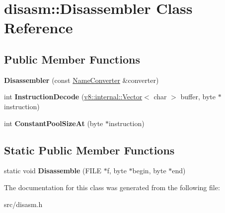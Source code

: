 \hypertarget{classdisasm_1_1_disassembler}{}\section{disasm\+:\+:Disassembler Class Reference}
\label{classdisasm_1_1_disassembler}
\subsection*{Public Member Functions}
\begin{DoxyCompactItemize}
\item 
\hypertarget{classdisasm_1_1_disassembler_a316f56d6b74b4785b50e61ee1586e9a0}{}{\bfseries Disassembler} (const \hyperlink{classdisasm_1_1_name_converter}{Name\+Converter} \&converter)\label{classdisasm_1_1_disassembler_a316f56d6b74b4785b50e61ee1586e9a0}

\item 
\hypertarget{classdisasm_1_1_disassembler_ad9cd04c72d0e03d72f0620a67dc95b8f}{}int {\bfseries Instruction\+Decode} (\hyperlink{classv8_1_1internal_1_1_vector}{v8\+::internal\+::\+Vector}$<$ char $>$ buffer, byte $\ast$instruction)\label{classdisasm_1_1_disassembler_ad9cd04c72d0e03d72f0620a67dc95b8f}

\item 
\hypertarget{classdisasm_1_1_disassembler_afb85ab5c4d646b7a1aeea00797c05b30}{}int {\bfseries Constant\+Pool\+Size\+At} (byte $\ast$instruction)\label{classdisasm_1_1_disassembler_afb85ab5c4d646b7a1aeea00797c05b30}

\end{DoxyCompactItemize}
\subsection*{Static Public Member Functions}
\begin{DoxyCompactItemize}
\item 
\hypertarget{classdisasm_1_1_disassembler_a53c900eb1da29da0e2828f9fa809bfb6}{}static void {\bfseries Disassemble} (F\+I\+L\+E $\ast$f, byte $\ast$begin, byte $\ast$end)\label{classdisasm_1_1_disassembler_a53c900eb1da29da0e2828f9fa809bfb6}

\end{DoxyCompactItemize}


The documentation for this class was generated from the following file\+:\begin{DoxyCompactItemize}
\item 
src/disasm.\+h\end{DoxyCompactItemize}
